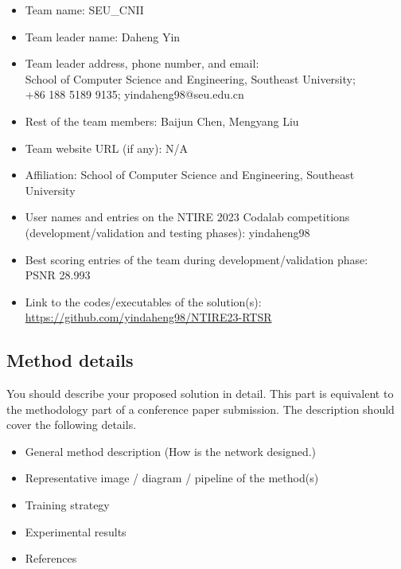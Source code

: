\documentclass[10pt,twocolumn,letterpaper]{article}
\begin{document}
\begin{itemize}
\item Team name: SEU\_CNII
\item Team leader name: Daheng Yin
\item Team leader address, phone number, and email: \\School of Computer Science and Engineering, Southeast University; \\+86 188 5189 9135; yindaheng98@seu.edu.cn
\item Rest of the team members: Baijun Chen, Mengyang Liu
\item Team website URL (if any): N/A
\item Affiliation: School of Computer Science and Engineering, Southeast University
\item User names and entries on the NTIRE 2023 Codalab competitions (development/validation and testing phases): yindaheng98
\item Best scoring entries of the team during development/validation phase:\\PSNR 28.993
\item Link to the codes/executables of the solution(s): \url{https://github.com/yindaheng98/NTIRE23-RTSR}
\end{itemize}

\subsection{Method details}

You should describe your proposed solution in detail. This part is equivalent to the methodology part of a conference paper submission. The description should cover the following details.

\begin{itemize}
\item General method description (How is the network designed.)                                
\item Representative image / diagram / pipeline of the method(s)  
\item Training strategy
\item Experimental results
\item References                                               
\end{itemize}
\end{document}
